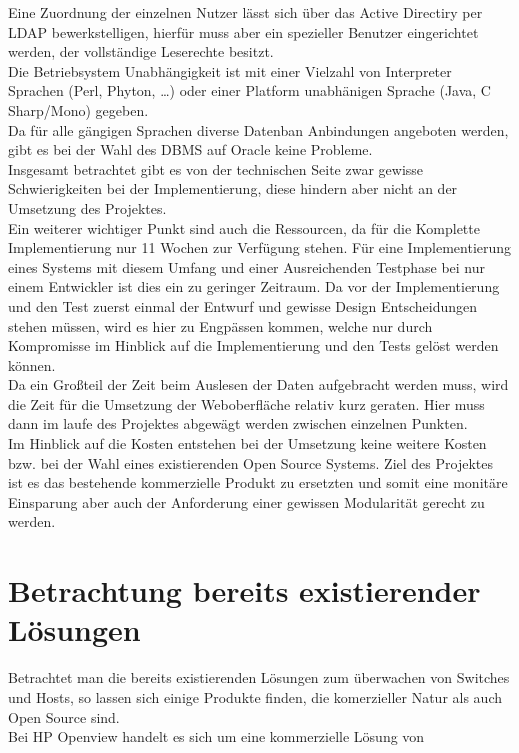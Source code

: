 Eine Zuordnung der einzelnen Nutzer lässt sich über das Active Directiry per LDAP bewerkstelligen, hierfür muss aber ein spezieller Benutzer eingerichtet werden, der vollständige Leserechte besitzt.\\
Die Betriebsystem Unabhängigkeit ist mit einer Vielzahl von Interpreter Sprachen (Perl, Phyton, …) oder einer Platform unabhänigen Sprache (Java, C Sharp/Mono) gegeben.\\
Da für alle gängigen Sprachen diverse Datenban Anbindungen angeboten werden, gibt es bei der Wahl des DBMS auf Oracle keine Probleme.\\
Insgesamt betrachtet gibt es von der technischen Seite zwar gewisse Schwierigkeiten bei der Implementierung, diese hindern aber nicht an der Umsetzung des Projektes.\\

Ein weiterer wichtiger Punkt sind auch die Ressourcen, da für die Komplette Implementierung nur 11 Wochen zur Verfügung stehen. Für eine Implementierung eines Systems mit diesem Umfang und einer Ausreichenden Testphase bei nur einem Entwickler ist dies ein zu geringer Zeitraum. Da vor der Implementierung und den Test zuerst einmal der Entwurf und gewisse Design Entscheidungen stehen müssen, wird es hier zu Engpässen kommen, welche nur durch Kompromisse im Hinblick auf die Implementierung und den Tests gelöst werden können.\\
Da ein Großteil der Zeit beim Auslesen der Daten aufgebracht werden muss, wird die Zeit für die Umsetzung der Weboberfläche relativ kurz geraten. Hier muss dann im laufe des Projektes abgewägt werden zwischen einzelnen Punkten.\\

Im Hinblick auf die Kosten entstehen bei der Umsetzung keine weitere Kosten bzw. bei der Wahl eines existierenden Open Source Systems. Ziel des Projektes ist es das bestehende kommerzielle Produkt zu ersetzten und somit eine monitäre Einsparung aber auch der Anforderung einer gewissen Modularität gerecht zu werden.\\

\section{Betrachtung bereits existierender Lösungen}
\label{sec:exitloesungen}

Betrachtet man die bereits existierenden Lösungen zum überwachen von Switches und Hosts, so lassen sich einige Produkte finden, die komerzieller Natur als auch Open Source sind.\\
Bei HP Openview handelt es sich um eine kommerzielle Lösung von 

